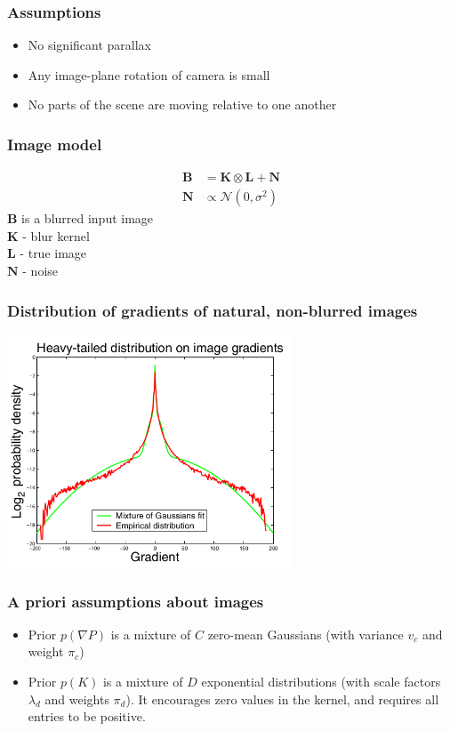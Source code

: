 \documentclass{beamer}
\begin{document}
\begin{frame}
    \frametitle{Assumptions}
    \begin{itemize}
            \item No significant parallax
            \item Any image-plane rotation of camera is small
            \item No parts of the scene are moving relative to one another
    \end{itemize}
\end{frame}
\begin{frame}
    \frametitle{Image model}
    \begin{center}
        \begin{align}
            \boldsymbol{B} &= \boldsymbol{K}\otimes\boldsymbol{L} + \boldsymbol{N}  \\
            \boldsymbol{N} &\propto \mathcal{N}(0, \sigma^2)
    \end{align}
        $\boldsymbol{B}$ is a blurred input image\\$\boldsymbol{K}$ - blur kernel\\$\boldsymbol{L}$ - true image\\$\boldsymbol{N}$ - noise
    \end{center}
\end{frame}
\begin{frame}
    \frametitle{Distribution of gradients of natural, non-blurred images}
    \begin{center}
        \includegraphics[width=240pt]{img/img-distr.png}
    \end{center}
\end{frame}
\begin{frame}
    \frametitle{A priori assumptions about images}
    \begin{itemize}
        \item Prior $p(\nabla P)$ is a mixture of $C$ zero-mean Gaussians (with variance $v_c$ and weight $\pi_c$)
        \item Prior $p(K)$ is a mixture of $D$ exponential distributions (with scale factors $\lambda_d$ and weights $\pi_d$).
            It encourages zero values in the kernel, and requires all entries to be positive.
    \end{itemize}
\end{frame}
\end{document}
